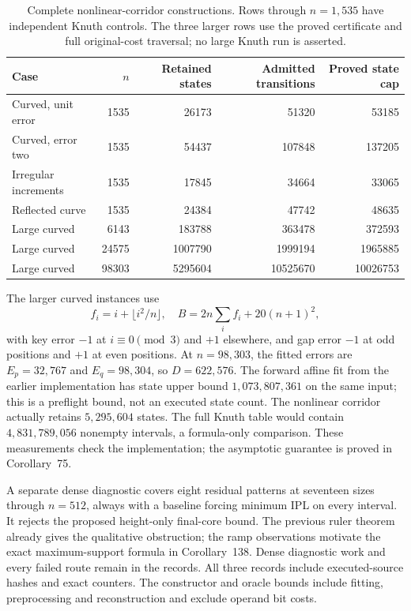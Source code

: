 \documentclass[11pt]{article}
\begin{document}
\begin{table}[htbp]
\centering\small
\begin{tabular}{lrrrr}
\toprule
Case & $n$ & Retained states & Admitted transitions & Proved state cap\\
\midrule
Curved, unit error & 1535 & 26173 & 51320 & 53185\\
Curved, error two & 1535 & 54437 & 107848 & 137205\\
Irregular increments & 1535 & 17845 & 34664 & 33065\\
Reflected curve & 1535 & 24384 & 47742 & 48635\\
Large curved & 6143 & 183788 & 363478 & 372593\\
Large curved & 24575 & 1007790 & 1999194 & 1965885\\
Large curved & 98303 & 5295604 & 10525670 & 10026753\\
\bottomrule
\end{tabular}
\caption{Complete nonlinear-corridor constructions. Rows through
$n=1{,}535$ have independent Knuth controls. The three larger rows use the
proved certificate and full original-cost traversal; no large Knuth run
is asserted.}
\label{tab:nonlinear-corridor-audit}
\end{table}

The larger curved instances use
\[
 f_i=i+\lfloor i^2/n\rfloor,\quad B=2n\sum_i f_i+20(n+1)^2,
\]
with key error $-1$ at $i\equiv0\pmod3$ and $+1$ elsewhere, and gap
error $-1$ at odd positions and $+1$ at even positions.
At $n=98{,}303$, the fitted errors are $E_p=32{,}767$ and $E_q=98{,}304$,
so $D=622{,}576$. The forward affine fit from the earlier implementation
has state upper bound $1{,}073{,}807{,}361$ on the same input; this is a
preflight bound, not an executed state count. The nonlinear corridor
actually retains $5{,}295{,}604$ states. The full Knuth table would contain
$4{,}831{,}789{,}056$ nonempty intervals, a formula-only comparison.
These measurements check the implementation; the asymptotic guarantee is
proved in Corollary~75.

A separate dense diagnostic covers eight residual patterns at seventeen
sizes through $n=512$, always with a baseline forcing minimum IPL on every
interval. It rejects the proposed height-only final-core bound. The
previous ruler theorem already gives the qualitative obstruction; the
ramp observations motivate the exact maximum-support formula in
Corollary~138. Dense diagnostic work and every
failed route remain in the records. All three records include executed-source
hashes and exact counters. The constructor and oracle bounds include fitting,
preprocessing and reconstruction and exclude operand bit costs.
\end{document}

